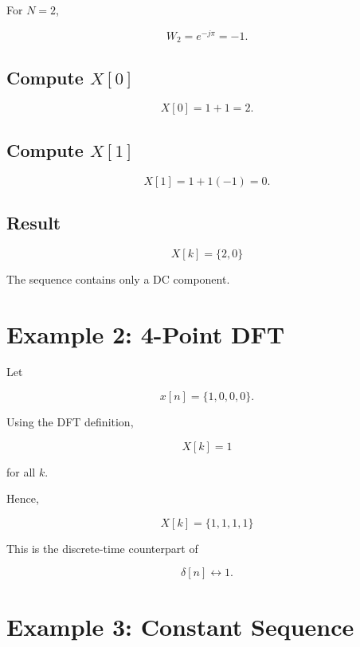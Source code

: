 For \(N=2\),

\[
W_2=e^{-j\pi}=-1.
\]


\subsection{Compute \(X[0]\)}

\[
X[0]=1+1=2.
\]


\subsection{Compute \(X[1]\)}

\[
X[1]=1+1(-1)=0.
\]


\subsection{Result}

\[
\boxed{
X[k]=\{2,0\}
}
\]

The sequence contains only a DC component.


\section{Example 2: 4-Point DFT}

Let

\[
x[n]=\{1,0,0,0\}.
\]

Using the DFT definition,

\[
X[k]=1
\]

for all \(k\).

Hence,

\[
\boxed{
X[k]=\{1,1,1,1\}
}
\]

This is the discrete-time counterpart of

\[
\delta[n]\leftrightarrow1.
\]


\section{Example 3: Constant Sequence}

